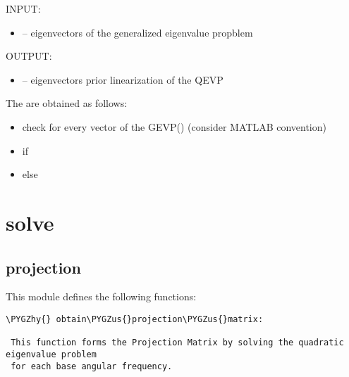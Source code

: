\documentclass[letterpaper,10pt,english]{sphinxmanual}
\def\PYGZus{\char`\_}
\def\PYGZhy{\char`\-}
\begin{document}
\begin{fulllineitems}
\label{index:unlinearize.unlinearize_matrices}
INPUT:
\begin{itemize}
\item {} 
 -- eigenvectors of the generalized eigenvalue propblem

\end{itemize}

OUTPUT:
\begin{itemize}
\item {} 
 -- eigenvectors prior linearization of the QEVP

\end{itemize}

The  are obtained as follows:
\begin{itemize}
\item {} 
check for every vector  of the GEVP() (consider MATLAB convention)

\item {} 
if 

\item {} 
else 

\end{itemize}

\end{fulllineitems}



\chapter{solve}
\label{index:solve}

\section{projection}
\label{index:module-projection}\label{index:projection}
This module defines the following functions:

\begin{Verbatim}[commandchars=\\\{\}]
\PYGZhy{} obtain\PYGZus{}projection\PYGZus{}matrix:

 This function forms the Projection Matrix by solving the quadratic eigenvalue problem 
 for each base angular frequency.
\end{Verbatim}
\end{document}
